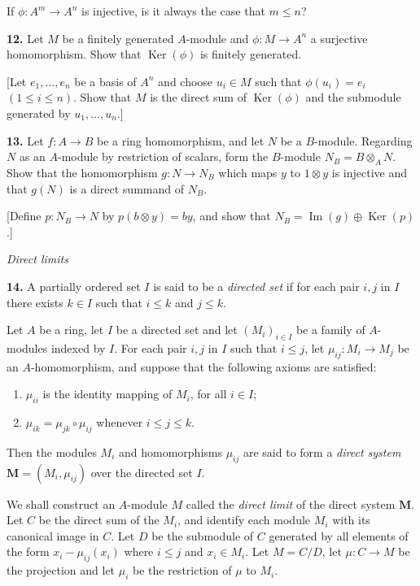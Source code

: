 If $\phi:A^m\longrightarrow A^n$ is injective, is it always the case that $m\leq n$?

\medskip
\noindent\textbf{12.} Let $M$ be a finitely generated $A$-module and $\phi:M\longrightarrow A^n$ a surjective homomorphism.  Show that $\operatorname{Ker}(\phi)$ is finitely generated.

[Let $e_1,\ldots,e_n$ be a basis of $A^n$ and choose $u_i\in M$ such that $\phi(u_i)=e_i$
$(1\leq i\leq n)$.  Show that $M$ is the direct sum of $\operatorname{Ker}(\phi)$ and the submodule
generated by $u_1,\ldots,u_n$.]

\medskip
\noindent\textbf{13.} Let $f:A\longrightarrow B$ be a ring homomorphism, and let $N$ be a $B$-module.  Regarding $N$
as an $A$-module by restriction of scalars, form the $B$-module $N_B=B\otimes_A N$.
Show that the homomorphism $g:N\longrightarrow N_B$ which maps $y$ to $1\otimes y$ is injective
and that $g(N)$ is a direct summand of $N_B$.

[Define $p:N_B\longrightarrow N$ by $p(b\otimes y)=by$, and show that $N_B=\operatorname{Im}(g)\oplus\operatorname{Ker}(p)$.]

\medskip
\noindent\emph{Direct limits}

\medskip
\noindent\textbf{14.} A partially ordered set $I$ is said to be a \emph{directed set} if for each pair $i,j$ in $I$ there
exists $k\in I$ such that $i\leq k$ and $j\leq k$.

Let $A$ be a ring, let $I$ be a directed set and let $(M_i)_{i\in I}$ be a family of $A$-modules
indexed by $I$.  For each pair $i,j$ in $I$ such that $i\leq j$, let $\mu_{ij}:M_i\longrightarrow M_j$ be an
$A$-homomorphism, and suppose that the following axioms are satisfied:
\begin{enumerate}
\renewcommand{\labelenumi}{(\arabic{enumi})}
\item $\mu_{ii}$ is the identity mapping of $M_i$, for all $i\in I$;
\item $\mu_{ik}=\mu_{jk}\circ\mu_{ij}$ whenever $i\leq j\leq k$.
\end{enumerate}
Then the modules $M_i$ and homomorphisms $\mu_{ij}$ are said to form a \emph{direct system}
$\mathbf M=(M_i,\mu_{ij})$ over the directed set $I$.

We shall construct an $A$-module $M$ called the \emph{direct limit} of the direct
system $\mathbf M$.  Let $C$ be the direct sum of the $M_i$, and identify each module $M_i$ with
its canonical image in $C$.  Let $D$ be the submodule of $C$ generated by all elements
of the form $x_i-\mu_{ij}(x_i)$ where $i\leq j$ and $x_i\in M_i$.  Let $M=C/D$, let $\mu:C\longrightarrow M$
be the projection and let $\mu_i$ be the restriction of $\mu$ to $M_i$.

